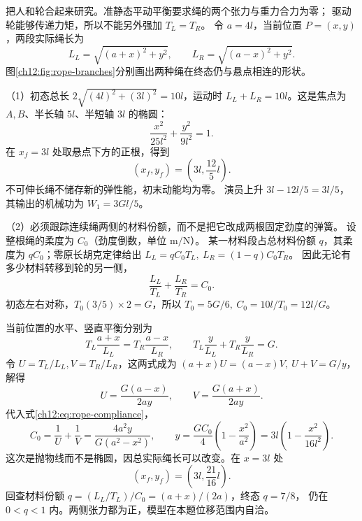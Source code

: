 \begin{xesolution}
把人和轮合起来研究。准静态平动平衡要求绳的两个张力与重力合力为零；
驱动轮能够传递力矩，所以不能另外强加 $T_L=T_R$。
令 $a=4l$，当前位置 $P=(x,y)$，两段实际绳长为
\[
 L_L=\sqrt{(a+x)^2+y^2},\qquad L_R=\sqrt{(a-x)^2+y^2}.
\]
图\ref{ch12:fig:rope-branches}分别画出两种绳在终态仍与悬点相连的形状。

\begin{center}
\label{ch12:fig:rope-branches}
\end{center}

（1）初态总长 $2\sqrt{(4l)^2+(3l)^2}=10l$，运动时
$L_L+L_R=10l$。这是焦点为 $A,B$、半长轴 $5l$、半短轴 $3l$ 的椭圆：
\[
 \frac{x^2}{25l^2}+\frac{y^2}{9l^2}=1.
\]
在 $x_f=3l$ 处取悬点下方的正根，得到
\[
 \boxed{(x_f,y_f)=\left(3l,\frac{12}{5}l\right)}.
\]
不可伸长绳不储存新的弹性能，初末动能均为零。
演员上升 $3l-12l/5=3l/5$，其输出的机械功为
$\boxed{W_1=3Gl/5}$。

（2）必须跟踪连续绳两侧的材料份额，而不是把它改成两根固定劲度的弹簧。
设整根绳的柔度为 $C_0$（劲度倒数，单位 $\mathrm{m/N}$）。
某一材料段占总材料份额 $q$，其柔度为 $qC_0$；零原长胡克定律给出
$L_L=qC_0T_L,\ L_R=(1-q)C_0T_R$。
因此无论有多少材料转移到轮的另一侧，
\begin{equation}
 \frac{L_L}{T_L}+\frac{L_R}{T_R}=C_0.
 \label{ch12:eq:rope-compliance}
\end{equation}
初态左右对称，$T_0(3/5)\times2=G$，所以
$T_0=5G/6,\ C_0=10l/T_0=12l/G$。

当前位置的水平、竖直平衡分别为
\[
 T_L\frac{a+x}{L_L}=T_R\frac{a-x}{L_R},\qquad
 T_L\frac y{L_L}+T_R\frac y{L_R}=G.
\]
令 $U=T_L/L_L,V=T_R/L_R$，这两式成为
$(a+x)U=(a-x)V,\ U+V=G/y$，解得
\[
 U=\frac{G(a-x)}{2ay},\qquad V=\frac{G(a+x)}{2ay}.
\]
代入式\eqref{ch12:eq:rope-compliance}，
\[
 C_0=\frac1U+\frac1V
 =\frac{4a^2y}{G(a^2-x^2)},\qquad
 y=\frac{GC_0}{4}\left(1-\frac{x^2}{a^2}\right)
 =3l\left(1-\frac{x^2}{16l^2}\right).
\]
这次是抛物线而不是椭圆，因总实际绳长可以改变。在 $x=3l$ 处
\[
 \boxed{(x_f,y_f)=\left(3l,\frac{21}{16}l\right)}.
\]
回查材料份额 $q=(L_L/T_L)/C_0=(a+x)/(2a)$，终态 $q=7/8$，
仍在 $0<q<1$ 内。两侧张力都为正，模型在本题位移范围内自洽。


\end{xesolution}
